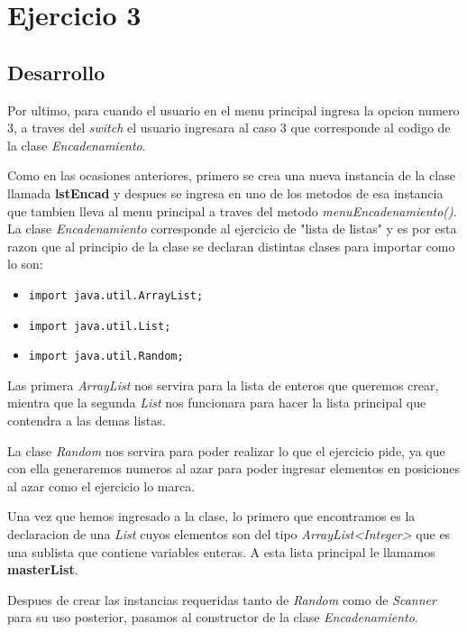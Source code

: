\documentclass{article}
\begin{document}
			\newpage

	\section{Ejercicio 3}
	
		\subsection{Desarrollo}
		
			Por ultimo, para cuando el usuario en el menu principal ingresa la opcion numero 3, a traves del \textit{switch} el usuario ingresara al caso 3 que corresponde al codigo de la clase \emph{Encadenamiento}.
			
			Como en las ocasiones anteriores, primero se crea una nueva instancia de la clase llamada \textbf{lstEncad} y despues se ingresa en uno de los metodos de esa instancia que tambien lleva al menu principal a traves del metodo \emph{menuEncadenamiento()}.\\
			
			La clase \emph{Encadenamiento} corresponde al ejercicio de "lista de listas" y es por esta razon que al principio de la clase se declaran distintas clases para importar como lo son:
			
			\begin{itemize}
				\item \verb|import java.util.ArrayList;|
				\item \verb|import java.util.List;|
				\item \verb|import java.util.Random;|
			\end{itemize}
		
			Las primera \emph{ArrayList} nos servira para la lista de enteros que queremos crear, mientra que la segunda \emph{List} nos funcionara para hacer la lista principal que contendra a las demas listas. 
			
			La clase \emph{Random} nos servira para poder realizar lo que el ejercicio pide, ya que con ella generaremos numeros al azar para poder ingresar elementos en posiciones al azar como el ejercicio lo marca.
			
			Una vez que hemos ingresado a la clase, lo primero que encontramos es la declaracion de una \emph{List} cuyos elementos son del tipo \emph{ArrayList<Integer>} que es una sublista que contiene variables enteras. A esta lista principal le llamamos \textbf{masterList}.
			
			Despues de crear las instancias requeridas tanto de \emph{Random} como de \emph{Scanner} para su uso posterior, pasamos al constructor de la clase \emph{Encadenamiento}.
			
\end{document}
